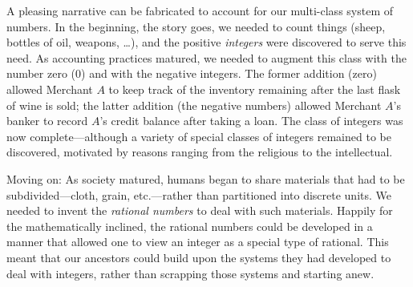 \noindent
A pleasing narrative can be fabricated to account for our multi-class
system of numbers.  In the beginning, the story goes, we needed to
count things (sheep, bottles of oil, weapons, \ldots), and the
positive {\it integers} were discovered to serve
this need.  As accounting practices matured, we needed to augment this
class with the number zero  ($0$) and with the negative integers.
The former addition (zero) allowed
Merchant $A$ to keep track of the inventory remaining after the last
flask of wine is sold; the latter addition (the negative numbers)
allowed Merchant $A$'s banker to record $A$'s
credit balance after taking a loan.
The class of integers was now complete---although a variety of
special classes of integers remained to be discovered, motivated by
reasons ranging from the religious to the intellectual.

Moving on: As society matured, humans began to share materials that
had to be subdivided---cloth, grain, etc.---rather than partitioned into
discrete units.  We needed to invent the {\it rational numbers}
 to deal with such materials.  Happily for the
mathematically inclined, the rational numbers could be developed in a
manner that allowed one to view an integer as a special type of rational.
This meant that our ancestors could build upon the systems they had
developed to deal with integers, rather than scrapping those systems
and starting anew.

\medskip

\noindent {}
\medskip

